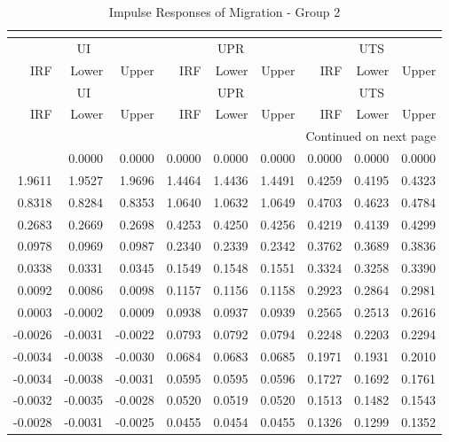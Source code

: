 \begin{longtable}{rrrrrrrrr}
\caption{Impulse Responses of Migration - Group 2}\\
\label{tab:mig_irf_group2}\\
\toprule
\multicolumn{3}{c}{UI} & \multicolumn{3}{c}{UPR} & \multicolumn{3}{c}{UTS} \\
IRF & Lower & Upper & IRF & Lower & Upper & IRF & Lower & Upper \\
\midrule
\endfirsthead
\toprule
\multicolumn{3}{c}{UI} & \multicolumn{3}{c}{UPR} & \multicolumn{3}{c}{UTS} \\
IRF & Lower & Upper & IRF & Lower & Upper & IRF & Lower & Upper \\
\midrule
\endhead
\midrule
\multicolumn{9}{r}{Continued on next page} \\
\midrule
\endfoot
\bottomrule
\endlastfoot
0.0000 & 0.0000 & 0.0000 & 0.0000 & 0.0000 & 0.0000 & 0.0000 & 0.0000 & 0.0000 \\
1.9611 & 1.9527 & 1.9696 & 1.4464 & 1.4436 & 1.4491 & 0.4259 & 0.4195 & 0.4323 \\
0.8318 & 0.8284 & 0.8353 & 1.0640 & 1.0632 & 1.0649 & 0.4703 & 0.4623 & 0.4784 \\
0.2683 & 0.2669 & 0.2698 & 0.4253 & 0.4250 & 0.4256 & 0.4219 & 0.4139 & 0.4299 \\
0.0978 & 0.0969 & 0.0987 & 0.2340 & 0.2339 & 0.2342 & 0.3762 & 0.3689 & 0.3836 \\
0.0338 & 0.0331 & 0.0345 & 0.1549 & 0.1548 & 0.1551 & 0.3324 & 0.3258 & 0.3390 \\
0.0092 & 0.0086 & 0.0098 & 0.1157 & 0.1156 & 0.1158 & 0.2923 & 0.2864 & 0.2981 \\
0.0003 & -0.0002 & 0.0009 & 0.0938 & 0.0937 & 0.0939 & 0.2565 & 0.2513 & 0.2616 \\
-0.0026 & -0.0031 & -0.0022 & 0.0793 & 0.0792 & 0.0794 & 0.2248 & 0.2203 & 0.2294 \\
-0.0034 & -0.0038 & -0.0030 & 0.0684 & 0.0683 & 0.0685 & 0.1971 & 0.1931 & 0.2010 \\
-0.0034 & -0.0038 & -0.0031 & 0.0595 & 0.0595 & 0.0596 & 0.1727 & 0.1692 & 0.1761 \\
-0.0032 & -0.0035 & -0.0028 & 0.0520 & 0.0519 & 0.0520 & 0.1513 & 0.1482 & 0.1543 \\
-0.0028 & -0.0031 & -0.0025 & 0.0455 & 0.0454 & 0.0455 & 0.1326 & 0.1299 & 0.1352 \\
\end{longtable}